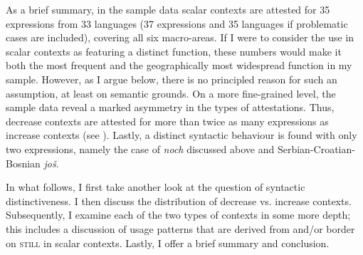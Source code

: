 As a brief summary, in the sample data scalar contexts are attested for 35 expressions from 33 languages (37 expressions and 35 languages if problematic cases are included), covering all six macro-areas. If I were to consider the use in scalar contexts as featuring a distinct function, these numbers would make it both the most frequent and the geographically most widespread function in my sample. However, as I argue below, there is no principled reason for such an assumption, at least on semantic grounds. On a more fine-grained level, the sample data reveal a marked asymmetry in the types of attestations. Thus, decrease contexts are attested for more than twice as many expressions as increase contexts (see ). Lastly, a distinct syntactic behaviour is found with only two expressions, namely the case of  \textit{noch} discussed above and Serbian\hyp Croatian\hyp Bosnian \textit{još}.

In what follows, I first take another look at the question of syntactic distinctiveness. I then discuss the distribution of decrease vs. increase contexts. Subsequently, I examine each of the two types of contexts in some more depth; this includes a discussion of usage patterns that are derived from and/or border on \textsc{still} in scalar contexts. Lastly, I offer a brief summary and conclusion.


